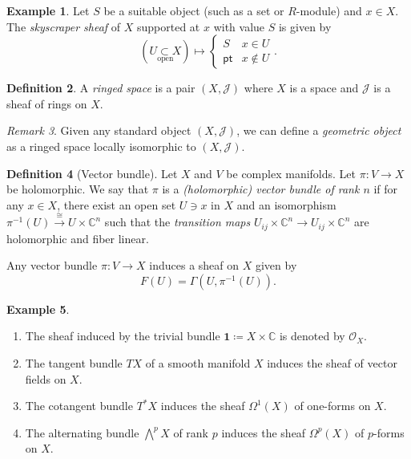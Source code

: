 \documentclass[10pt,letterpaper,cm]{nupset}
\theoremstyle{definition}
\newtheorem{defn}{Definition}[subsection]
\newtheorem{exmp}[defn]{Example}
\theoremstyle{theorem}
\theoremstyle{remark}
\newtheorem{remark}[defn]{Remark}
\newcommand{\C}{\mathbb C}
\newcommand{\J}{\mathcal J}
\renewcommand{\O}{\mathcal O}
\newcommand{\1}{\mathbb{1}}
\newcommand{\0}{\vec 0}
\newcommand{\pt}{\mathsf{pt}}
\newcommand{\be}{\begin{enumerate}}
\newcommand{\ee}{\end{enumerate}}
\begin{document}
\begin{exmp}
Let $S$ be a suitable object (such as a set or $R$-module)  and $x\in X$. The \textit{skyscraper sheaf} of $X$ supported at $x$ with value $S$ is given by
\[
\left(\underset{\text{open}}{U \subset X}\right) \mapsto \begin{cases}
S & x\in U
\\ \pt & x\notin U
\end{cases}.
\]
\end{exmp}

\smallskip

\begin{defn}
A \textit{ringed space} is a pair $\left(X, \J\right)$ where $X$ is a space and $\J$ is a sheaf of rings on $X$.
\end{defn}

\begin{remark} Given any standard object $\left(X, \J\right)$, we can define a \textit{geometric object} as a ringed space locally isomorphic to $\left(X, \J\right)$.
\end{remark}

\medskip

\begin{defn}[Vector bundle]
Let $X$ and $V$ be complex manifolds. Let $\pi : V \to X$ be holomorphic. We say that $\pi$ is a \textit{(holomorphic) vector bundle of rank $n$} if for any $x\in X$, there exist an open set $U\ni x$ in $X$ and an isomorphism $\pi^{-1}(U) \overset{\cong}{\longrightarrow} U \times \C^n$ such that the \textit{transition maps} $U_{ij} \times \C^n \to U_{ij} \times \C^n$ are holomorphic and fiber linear.
\end{defn}

\smallskip

Any vector bundle $\pi : V \to X$ induces a sheaf on $X$ given by
\[
F(U) = \Gamma\left(U, \pi^{-1}(U)\right).
\]

\begin{exmp} $ $
\be
\item The sheaf induced by the trivial bundle $\mathbf{1} \coloneqq X \times \C$ is denoted by $\O_X$.
\item The tangent bundle $T{X}$ of a smooth manifold $X$ induces the sheaf of vector fields on $X$.
\item The cotangent bundle $T^{\ast}{X}$ induces the sheaf $\Omega^1(X)$ of one-forms on $X$.
\item The alternating bundle $\bigwedge^p{X}$ of rank $p$ induces the sheaf $\Omega^p(X)$ of $p$-forms on $X$.
\ee
\end{exmp}
\end{document}

